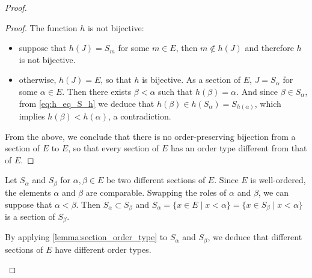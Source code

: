 \documentclass[11pt,a4paper,twoside]{article}
\theoremstyle{definition}
\begin{document}
\begin{proof}
\begin{enumerate}[(a)]
\begin{proof}
      The function $h$ is not bijective:
    \begin{itemize}

      \item suppose that $h ( J ) = S_m$ for some $m \in E$, then $m \notin h ( J )$ and therefore $h$ is not bijective.

      \item otherwise, $h ( J ) = E$, so that $h$ is bijective. As a section of $E$, $J = S_\alpha$ for some $\alpha \in E$.
        Then there exists $\beta < \alpha$ such that $h ( \beta ) = \alpha$. And since $\beta \in S_\alpha$, from \eqref{eq:h_eq_S_h}
        we deduce that $h ( \beta ) \in h ( S_\alpha ) = S_{ h ( \alpha ) }$, which implies $h ( \beta ) < h ( \alpha )$,
        a contradiction.

    \end{itemize}

    From the above, we conclude that there is no order-preserving bijection from a section of $E$ to $E$, so that
    every section of $E$ has an order type different from that of $E$.

    \end{proof}

    Let $S_\alpha$ and $S_\beta$ for $\alpha, \beta \in E$ be two different sections of $E$. Since $E$ is well-ordered,
    the elements $\alpha$ and $\beta$ are comparable. Swapping the roles of $\alpha$ and $\beta$, we can suppose that
    $\alpha < \beta$. Then $S_\alpha \subset S_\beta$ and $S_\alpha = \{ x \in E \mid x < \alpha \} = \{ x \in S_\beta \mid x < \alpha \}$
    is a section of $S_\beta$.

    By applying \cref{lemma:section_order_type} to $S_\alpha$ and $S_\beta$, we deduce that different sections of $E$ have
    different order types.

  \end{enumerate}

\end{proof}
\end{document}
